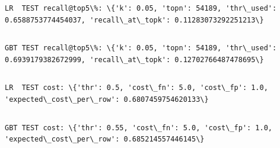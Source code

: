 \documentclass[11pt]{article}
\begin{document}
    \begin{Verbatim}[commandchars=\\\{\}]
LR  TEST recall@top5\%: \{'k': 0.05, 'topn': 54189, 'thr\_used':
0.6588753774454037, 'recall\_at\_topk': 0.11283073292251213\}
    \end{Verbatim}

    \begin{Verbatim}[commandchars=\\\{\}]

    \end{Verbatim}

    \begin{Verbatim}[commandchars=\\\{\}]
GBT TEST recall@top5\%: \{'k': 0.05, 'topn': 54189, 'thr\_used':
0.6939179382672999, 'recall\_at\_topk': 0.12702766487478695\}
    \end{Verbatim}

    \begin{Verbatim}[commandchars=\\\{\}]

    \end{Verbatim}

    \begin{Verbatim}[commandchars=\\\{\}]
LR  TEST cost: \{'thr': 0.5, 'cost\_fn': 5.0, 'cost\_fp': 1.0,
'expected\_cost\_per\_row': 0.6807459754620133\}
    \end{Verbatim}

    \begin{Verbatim}[commandchars=\\\{\}]

    \end{Verbatim}

    \begin{Verbatim}[commandchars=\\\{\}]
GBT TEST cost: \{'thr': 0.55, 'cost\_fn': 5.0, 'cost\_fp': 1.0,
'expected\_cost\_per\_row': 0.685214557446145\}
    \end{Verbatim}

    \begin{Verbatim}[commandchars=\\\{\}]

    \end{Verbatim}
\end{document}
